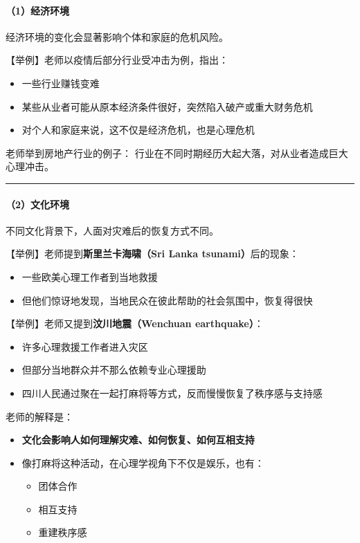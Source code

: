 \documentclass[
  chinese,
  9pt,
  a4paper,
]{ctexart}
\providecommand{\tightlist}{%
  \setlength{\itemsep}{0pt}\setlength{\parskip}{0pt}}
\begin{document}
\paragraph{（1）经济环境}\label{ux7ecfux6d4eux73afux5883}

经济环境的变化会显著影响个体和家庭的危机风险。

【举例】老师以疫情后部分行业受冲击为例，指出：

\begin{itemize}
\tightlist
\item
  一些行业赚钱变难
\item
  某些从业者可能从原本经济条件很好，突然陷入破产或重大财务危机
\item
  对个人和家庭来说，这不仅是经济危机，也是心理危机
\end{itemize}

老师举到房地产行业的例子：
行业在不同时期经历大起大落，对从业者造成巨大心理冲击。

\begin{center}\rule{0.5\linewidth}{0.5pt}\end{center}

\paragraph{（2）文化环境}\label{ux6587ux5316ux73afux5883}

不同文化背景下，人面对灾难后的恢复方式不同。

【举例】老师提到\textbf{斯里兰卡海啸（Sri Lanka tsunami）}后的现象：

\begin{itemize}
\tightlist
\item
  一些欧美心理工作者到当地救援
\item
  但他们惊讶地发现，当地民众在彼此帮助的社会氛围中，恢复得很快
\end{itemize}

【举例】老师又提到\textbf{汶川地震（Wenchuan earthquake）}：

\begin{itemize}
\tightlist
\item
  许多心理救援工作者进入灾区
\item
  但部分当地群众并不那么依赖专业心理援助
\item
  四川人民通过聚在一起打麻将等方式，反而慢慢恢复了秩序感与支持感
\end{itemize}

老师的解释是：

\begin{itemize}
\item
  \textbf{文化会影响人如何理解灾难、如何恢复、如何互相支持}
\item
  像打麻将这种活动，在心理学视角下不仅是娱乐，也有：

  \begin{itemize}
  \tightlist
  \item
    团体合作
  \item
    相互支持
  \item
    重建秩序感
  \end{itemize}
\end{itemize}
\end{document}
